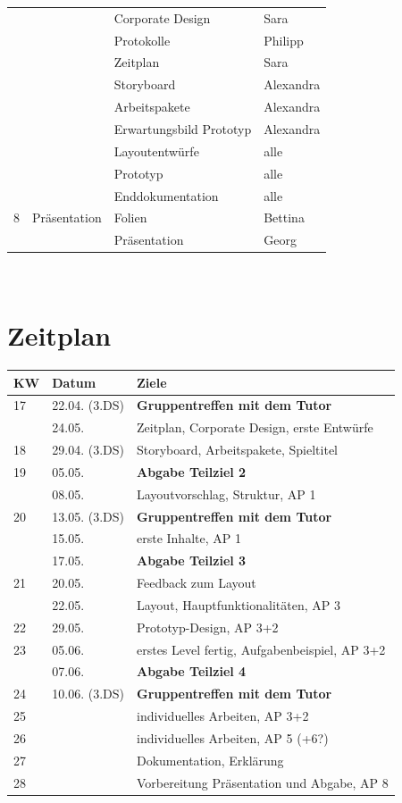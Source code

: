 \documentclass[10pt,a4paper,notitlepage]{report}
\begin{document}
\begin{tabular}{l|l|l|l}
	&& Corporate Design & Sara\\
	&& Protokolle & Philipp\\
	&& Zeitplan & Sara\\
	&& Storyboard & Alexandra\\
	&& Arbeitspakete & Alexandra\\
	&& Erwartungsbild Prototyp & Alexandra\\
	&& Layoutentwürfe & alle\\
	&& Prototyp & alle\\
	&& Enddokumentation & alle\\\hline
	8 & Präsentation & Folien & Bettina\\
	&& Präsentation & Georg\\\hline
	\end{tabular}\
	
	\clearpage

	\section{Zeitplan}
	\begin{tabular}{l|l|l}\hline
 	 KW & Datum & Ziele\\\hline
	17 & 22.04. (3.DS) & \textbf{Gruppentreffen mit dem Tutor}\\
	& 24.05. & Zeitplan, Corporate Design, erste Entwürfe\\\hline
	18 & 29.04. (3.DS) &  Storyboard, Arbeitspakete, Spieltitel\\\hline
	19 & 05.05. & \textbf{Abgabe Teilziel 2}\\
	& 08.05.& Layoutvorschlag, Struktur, AP 1\\\hline
	20 & 13.05. (3.DS) & \textbf{Gruppentreffen mit dem Tutor}\\
	& 15.05. & erste Inhalte, AP 1\\
	& 17.05. & \textbf{Abgabe Teilziel 3}\\\hline
	21 & 20.05. & Feedback zum Layout\\
	& 22.05. & Layout, Hauptfunktionalitäten, AP 3\\\hline
	22 & 29.05. & Prototyp-Design, AP 3+2 \\\hline
	23 & 05.06. & erstes Level fertig, Aufgabenbeispiel, AP 3+2\\
	& 07.06. & \textbf{Abgabe Teilziel 4}\\\hline
	24 & 10.06. (3.DS) & \textbf{Gruppentreffen mit dem Tutor}\\\hline
	25 & & individuelles Arbeiten, AP 3+2\\\hline
	26 & & individuelles Arbeiten, AP 5 (+6?)\\\hline
	27 & & Dokumentation, Erklärung\\\hline
	28 & & Vorbereitung Präsentation und Abgabe, AP 8\\
	\end{tabular}
\end{document}
